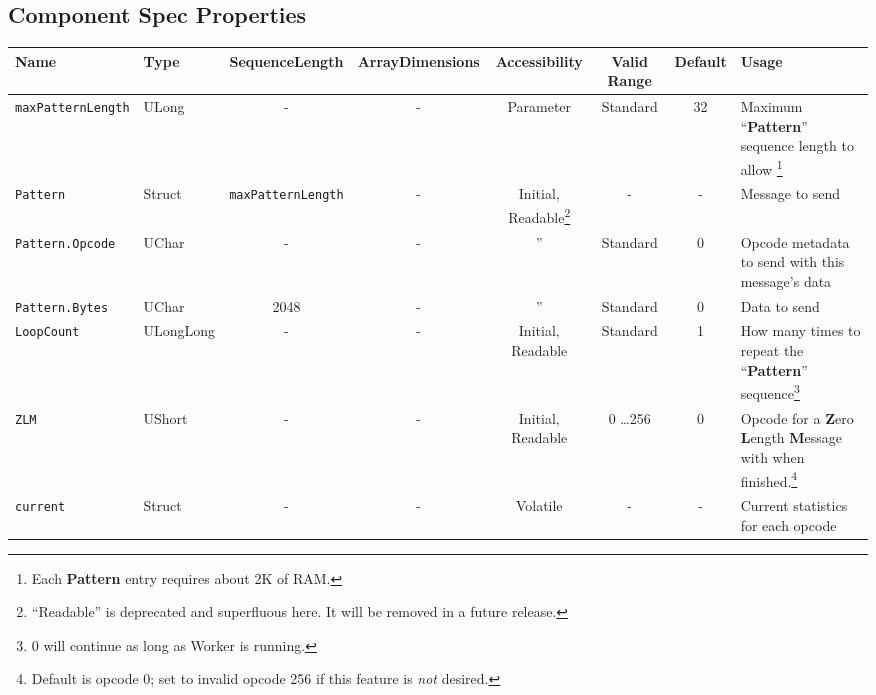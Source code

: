 \documentclass{article}
\begin{document}
\begin{landscape}
	\section*{Component Spec Properties}
	\begin{scriptsize}
		\begin{minipage}{\textwidth}
			\renewcommand*\footnoterule{} %
			\renewcommand{\thempfootnote}{\arabic{mpfootnote}} %
			\begin{tabular}{|p{3cm}|p{1.5cm}|c|c|c|c|c|p{7cm}|}
				\hline
				\rowcolor{blue}
				Name &
				Type &
				SequenceLength &
				ArrayDimensions &
				Accessibility &
				Valid Range &
				Default &
				Usage \\
				\hline
				\verb+maxPatternLength+ &
				ULong &
				- &
				- &
				Parameter &
				Standard &
				32 &
				Maximum ``\textbf{Pattern}'' sequence length to allow \footnote{Each \textbf{Pattern} entry requires about 2K of RAM.} \\
				\hline
				\verb+Pattern+ &
				Struct &
				\verb+maxPatternLength+ &
				- &
				Initial, Readable\footnote{``Readable'' is deprecated and superfluous here. It will be removed in a future release.}\setcounter{fnreadable}{\thempfootnote} &
				- &
				- &
				Message to send \\
				\hline
				\verb+Pattern.Opcode+ &
				UChar &
				- &
				- &
				'' &
				Standard &
				0 &
				Opcode metadata to send with this message's data \\
				\hline
				\verb+Pattern.Bytes+ &
				UChar &
				2048 &
				- &
				'' &
				Standard &
				0 &
				Data to send \\
				\hline
				\verb+LoopCount+ &
				ULongLong &
				- &
				- &
				Initial, Readable\footnotemark[\thefnreadable] &
				Standard &
				1 &
				How many times to repeat the ``\textbf{Pattern}'' sequence\footnote{0 will continue as long as Worker is running.} \\
				\hline
				\verb+ZLM+ &
				UShort &
				- &
				- &
				Initial, Readable\footnotemark[\thefnreadable] &
				0 \ldots 256 &
				0 &
				Opcode for a \textbf{Z}ero \textbf{L}ength \textbf{M}essage with when finished.\footnote{Default is opcode 0; set to invalid opcode 256 if this feature is \textit{not} desired.} \\
				\hline
				\verb+current+ &
				Struct &
				- &
				- &
				Volatile &
				- &
				- &
				Current statistics for each opcode \\

\end{tabular}
\end{minipage}
\end{scriptsize}
\end{landscape}
\end{document}
